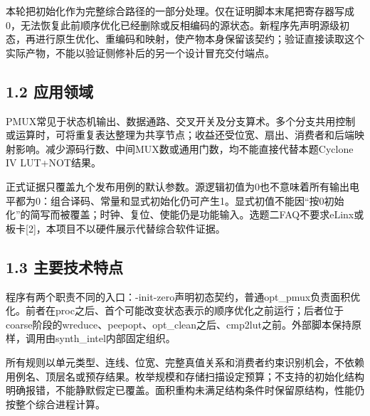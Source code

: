 \documentclass[UTF8,fontset=fandol,12pt]{ctexart}
\begin{document}
本轮把初始化作为完整综合路径的一部分处理。仅在证明脚本末尾把寄存器写成0，无法恢复此前顺序优化已经删除或反相编码的源状态。新程序先声明源级初态，再进行原生优化、重编码和映射，使产物本身保留该契约；验证直接读取这个实际产物，不能以验证侧修补后的另一个设计冒充交付端点。

\Needspace{129.6pt}\subsection*{1.2  应用领域}
PMUX常见于状态机输出、数据通路、交叉开关及分支算术。多个分支共用控制或运算时，可将重复表达整理为共享节点；收益还受位宽、扇出、消费者和后端映射影响。减少源码行数、中间MUX数或通用门数，均不能直接代替本题Cyclone IV LUT+NOT结果。

正式证据只覆盖九个发布用例的默认参数。源逻辑初值为0也不意味着所有输出电平都为0：组合译码、常量和显式初始化仍可产生1。显式初值不能因“按0初始化”的简写而被覆盖；时钟、复位、使能仍是功能输入。选题二FAQ不要求eLinx或板卡[2]，本项目不以硬件展示代替综合软件证据。

\Needspace{129.6pt}\subsection*{1.3  主要技术特点}
程序有两个职责不同的入口：-init-zero声明初态契约，普通opt\_\allowbreak{}pmux负责面积优化。前者在proc之后、首个可能改变状态表示的顺序优化之前运行；后者位于coarse阶段的wreduce、peepopt、opt\_\allowbreak{}clean之后、cmp2lut之前。外部脚本保持原样，调用由synth\_\allowbreak{}intel内部固定组织。

所有规则以单元类型、连线、位宽、完整真值关系和消费者约束识别机会，不依赖用例名、顶层名或预存结果。枚举规模和存储扫描设定预算；不支持的初始化结构明确报错，不能静默假定已覆盖。面积重构未满足结构条件时保留原结构，性能仍按整个综合进程计算。
\end{document}
